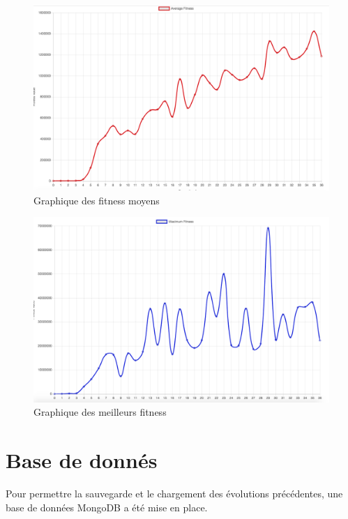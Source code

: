 \documentclass{article}
\begin{document}
\begin{figure}[H]
\begin{center}
	\includegraphics[scale=0.3]{avgfitgraph.png}
	\caption{Graphique des fitness moyens}
\end{center}
\end{figure}

\begin{figure}[H]
\begin{center}
	\includegraphics[scale=0.3]{maxfitgraph.png}
	\caption{Graphique des meilleurs fitness}
\end{center}
\end{figure}


\newpage
\section{Base de donnés}

Pour permettre la sauvegarde et le chargement des évolutions précédentes, une base de données MongoDB a été mise en place.\\
\end{document}
